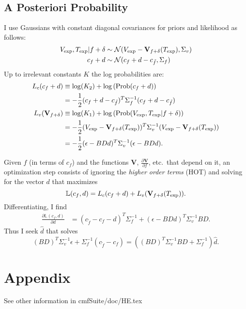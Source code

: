 \documentclass[12pt]{article}
\newcommand{\normal}[2]{{\cal N}(#1,#2)}
\newcommand{\normalexp}[3]{ -\frac{1}{2}
      (#1 - #2)^T #3^{-1} (#1 - #2) }
\newcommand{\fnom}{\tilde f}
\newcommand{\Prob}{\text{Prob}}
\newcommand{\partiald}[2]{\frac{\partial #1}{\partial #2}}
\newcommand\Vt{\mathbf{V}}
\newcommand\vexp{V_{\rm{exp}}}
\newcommand\texp{T_{\rm{exp}}}
\newcommand\cf{c_f}
\newcommand\DVDf{\partiald{\Vt}{f}}
\newcommand\Lbb{\mathbb{L}}
\begin{document}
\subsection{A Posteriori Probability}
\label{sec:app}

I use Gaussians with constant diagonal covariances for priors and
likelihood as follows:
\begin{align}
\vexp,\texp | f+\delta &\sim
\normal{\vexp-\Vt_{f+\delta}(\texp)}{\Sigma_v} \\
\cf+d &\sim \normal{\cf+d - c_{\fnom}}{\Sigma_f}
\end{align}
Up to irrelevant constants $K$ the log probabilities are:
\begin{align}
  L_c(\cf+d) & \equiv \log(K_2) + \log \left(\Prob(\cf+d) \right)\\
  & = \normalexp{\cf+d}{c_{\fnom}}{\Sigma_f}\\
  L_v(\Vt_{f+\delta}) & \equiv \log(K_1) + \log
  \left(\Prob(\vexp,\texp | f+\delta) \right)
  \nonumber \\
  & = \normalexp{\vexp}{\Vt_{f+\delta}(\texp)}{\Sigma_v} \\
  &= \normalexp{\epsilon}{BDd}{\Sigma_v}.
\end{align}

Given $f$ (in terms of $\cf$) and the functions $\Vt$, $\DVDf$, etc.\
that depend on it, an optimization step consists of ignoring the
\emph{higher order terms} (HOT) and solving for the vector $d$ that
maximizes
\begin{equation}
  \label{eq:L}
  \Lbb(\cf,d) = L_c(\cf + d) + L_v(\Vt_{f+\delta}(\texp)).
\end{equation}
Differentiating, I find
\begin{align*}
  \partiald{\Lbb(\cf,d)}{d} &= (c_{\fnom} - \cf - d)^T
  \Sigma^{-1}_f + (\epsilon - BDd)^T \Sigma_v^{-1}BD.
\end{align*}
Thus I seek $\hat d$ that solves
\begin{equation}
  \label{eq:dmap}
  (BD)^T\Sigma_v^{-1}\epsilon + \Sigma_f^{-1} (c_{\tilde f} - \cf) = 
  \left((BD)^T\Sigma_v^{-1}BD + \Sigma_f^{-1} \right) \hat d.
\end{equation}

\section*{Appendix}
\label{sec:appendix}

See other information in cmfSuite/doc/HE.tex
\end{document}
